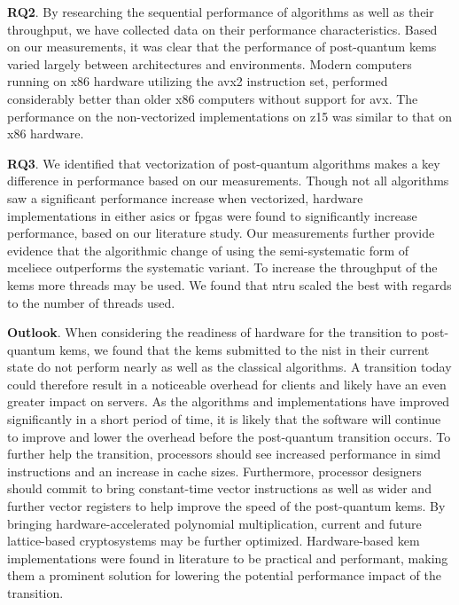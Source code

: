 \noindent\textbf{RQ2}. By researching the sequential performance of algorithms as well as their throughput, we have collected data on their performance characteristics. Based on our measurements, it was clear that the performance of \gls{post-quantum} \glspl{kem} varied largely between architectures and environments. Modern computers running on \gls{x86} hardware utilizing the \gls{avx2} instruction set, performed considerably better than older \gls{x86} computers without support for \gls{avx}. The performance on the non-vectorized implementations on \gls{z15} was similar to that on \gls{x86} hardware.

\noindent\textbf{RQ3}. We identified that vectorization of \gls{post-quantum} algorithms makes a key difference in performance based on our measurements. Though not all algorithms saw a significant performance increase when vectorized, hardware implementations in either \glspl{asic} or \glspl{fpga} were found to significantly increase performance, based on our literature study. Our measurements further provide evidence that the algorithmic change of using the semi-systematic form of \gls{mceliece} outperforms the systematic variant. To increase the throughput of the \glspl{kem} more threads may be used. We found that \gls{ntru} scaled the best with regards to the number of threads used.

\noindent\textbf{Outlook}. When considering the readiness of hardware for the transition to \gls{post-quantum} \glspl{kem}, we found that the \glspl{kem} submitted to the \gls{nist} in their current state do not perform nearly as well as the classical algorithms. A transition today could therefore result in a noticeable overhead for clients and likely have an even greater impact on servers. As the algorithms and implementations have improved significantly in a short period of time, it is likely that the software will continue to improve and lower the overhead before the \gls{post-quantum} transition occurs. To further help the transition, processors should see increased performance in \gls{simd} instructions and an increase in cache sizes. Furthermore, processor designers should commit to bring constant-time vector instructions as well as wider and further vector registers to help improve the speed of the \gls{post-quantum} \glspl{kem}. By bringing hardware-accelerated polynomial multiplication, current and future lattice-based cryptosystems may be further optimized. Hardware-based \gls{kem} implementations were found in literature to be practical and performant, making them a prominent solution for lowering the potential performance impact of the transition.

